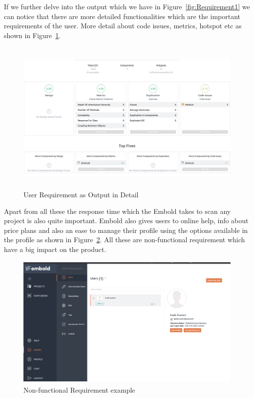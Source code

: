 If we further delve into the output which we have in Figure~\ref{fig:Requirement1} we can notice that there are more detailed functionalities which are the important requirements of the user. More detail about code issues, metrics, hotspot etc as shown in Figure~\ref{fig:Requirement2}.\par
\begin{figure}[htbp]
\begin{center}
\includegraphics[width=6.5 in, height=3in]{requirement2.png}
\caption{User Requirement as Output in Detail}
\label{fig:Requirement2}
\end{center}
\end{figure}
Apart from all these the response time which the Embold takes to scan any project is also quite important. Embold also gives users to online help, info about price plans and also an ease to manage their profile using the options available in the profile as shown in Figure~\ref{fig:Requirement3}. All these are non-functional requirement which have a big impact on the product. 
\begin{figure}[htbp]
\begin{center}
\includegraphics[width=6.5 in, height=2.6in]{Requirement3.png}
\caption{Non-functional Requirement example} 
\label{fig:Requirement3}
\end{center}
\end{figure}
